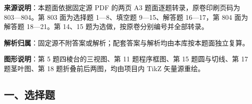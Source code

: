 

\begin{gknotice}
\textbf{来源说明}：本题面依据固定源 PDF 的两页 A3 题面逐题转录，原卷印刷页码为 803—804。第 803 面为选择题 1—8、填空题 9—15、解答题 16—17，第 804 面为解答题 18—21。第 14、15 题为选做，按原卷分别编号并全部转录。

\textbf{解析归属}：固定源不附答案或解析；配套答案与解析均由本库按本题面独立复算。

\textbf{图形说明}：第 5 题四棱台的三视图、第 11 题程序框图、第 15 题圆与切线、第 17 题茎叶图、第 18 题折叠前后两图，均由项目内 TikZ 矢量源重绘。
\end{gknotice}

\begingroup
\renewcommand{\gkpart}[1]{\Needspace{0.2\textheight}\subsection*{#1}\nopagebreak}
\gkpart{一、选择题}
\endgroup

